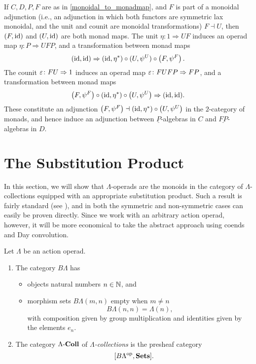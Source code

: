 \begin{cor}\label{monoidaladj_cor}
If $C, D, P, F$ are as in \cref{monoidal_to_monadmap}, and $F$ is part of a monoidal adjunction (i.e., an adjunction in which both functors are symmetric lax monoidal, and the unit and counit are monoidal transformations) $F \dashv U$, then $(F, \textrm{id})$ and $(U, \textrm{id})$ are both monad maps. The unit $\eta \colon 1 \Rightarrow UF$ induces an operad map $\eta \colon P \Rightarrow UFP$, and a transformation between monad maps
  \[
    (\textrm{id}, \textrm{id}) \Rightarrow (\textrm{id}, \eta^*) \circ (U, \psi^U) \circ \left(F, \psi^F\right).
  \]
The counit $\varepsilon \colon FU \Rightarrow 1$ induces an operad map $\varepsilon \colon FUFP \Rightarrow FP$, and a transformation between monad maps
  \[
    \left(F, \psi^F\right) \circ (\textrm{id}, \eta^*) \circ \left(U,\psi^U\right) \Rightarrow (\textrm{id}, \textrm{id}).
  \]
These constitute an adjunction $\left(F,\psi^F\right) \dashv (\textrm{id}, \eta^*) \circ \left(U, \psi^U\right)$ in the $2$-category of monads, and hence induce an adjunction between $\underline{P}$-algebras in $C$ and $\underline{FP}$-algebras in $D$.
\end{cor}

\section{The Substitution Product}\label{sec:sub}

In this section, we will show that $\Lambda$-operads are the monoids in the category of $\Lambda$-collections equipped with an appropriate substitution product. 
Such a result is fairly standard (see  \cite{mss-op}), and in both the symmetric and non-symmetric cases can easily be proven directly. 
Since we work with an arbitrary action operad, however, it will be more economical to take the abstract approach using coends and Day convolution.

\begin{Defi}\label{Defi:BLambda}
Let $\Lambda$ be an action operad.
\begin{enumerate}
\item The category $B\Lambda$ has 
\begin{itemize}
\item objects natural numbers $n \in \mathbb{N}$, and
\item morphism sets $B\Lambda(m,n)$ empty when $m\neq n$
\[
B\Lambda(n,n) = \Lambda(n),
\]
with composition given by group multiplication and identities given by the elements $e_n$.
\end{itemize}
\item The category $\Lambda\mathbf{\mbox{-}Coll}$ of \emph{$\Lambda$-collections} is the presheaf category
  \[
[B\Lambda^{\textrm{op}}, \mathbf{Sets}].
  \]
\end{enumerate}
\end{Defi}

